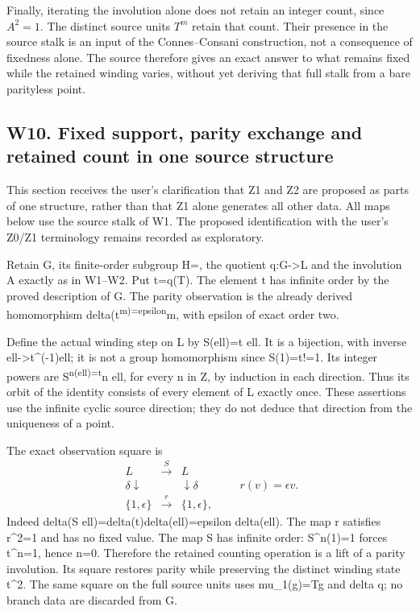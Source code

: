 \documentclass[
  11pt,
]{article}
\begin{document}
Finally, iterating the involution alone does not retain an integer
count, since \(A^2=1\). The distinct source units \(T^m\) retain that
count. Their presence in the source stalk is an input of the
Connes--Consani construction, not a consequence of fixedness alone. The
source therefore gives an exact answer to what remains fixed while the
retained winding varies, without yet deriving that full stalk from a
bare parityless point.

\subsection{W10. Fixed support, parity exchange and retained count in
one source
structure}\label{w10.-fixed-support-parity-exchange-and-retained-count-in-one-source-structure}

This section receives the user's clarification that Z1 and Z2 are
proposed as parts of one structure, rather than that Z1 alone generates
all other data. All maps below use the source stalk of W1. The proposed
identification with the user's Z0/Z1 terminology remains recorded as
exploratory.

Retain G, its finite-order subgroup H=, the quotient q:G-\textgreater L
and the involution A exactly as in W1--W2. Put t=q(T). The element t has
infinite order by the proved description of G. The parity observation is
the already derived homomorphism delta(t\textsuperscript{m)=epsilon}m,
with epsilon of exact order two.

Define the actual winding step on L by S(ell)=t ell. It is a bijection,
with inverse ell-\textgreater t\^{}(-1)ell; it is not a group
homomorphism since S(1)=t!=1. Its integer powers are
S\textsuperscript{n(ell)=t}n ell, for every n in Z, by induction in each
direction. Thus its orbit of the identity consists of every element of L
exactly once. These assertions use the infinite cyclic source direction;
they do not deduce that direction from the uniqueness of a point.

The exact observation square is \[
\begin{array}{ccc}
L&\xrightarrow{S}&L\\
\delta\downarrow&&\downarrow\delta\\
\{1,\epsilon\}&\xrightarrow{r}&\{1,\epsilon\},
\end{array}
\qquad r(v)=\epsilon v.
\] Indeed delta(S ell)=delta(t)delta(ell)=epsilon delta(ell). The map r
satisfies r\^{}2=1 and has no fixed value. The map S has infinite order:
S\^{}n(1)=1 forces t\^{}n=1, hence n=0. Therefore the retained counting
operation is a lift of a parity involution. Its square restores parity
while preserving the distinct winding state t\^{}2. The same square on
the full source units uses mu\_1(g)=Tg and delta q; no branch data are
discarded from G.
\end{document}
